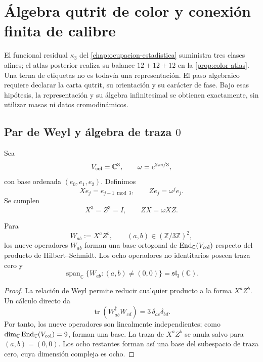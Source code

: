 \chapter{Álgebra qutrit de color y conexión finita de calibre}
\label{chap:algebra-color-qutrit}

El funcional residual \(\kappa_3\) del
\cref{chap:ocupacion-estadistica} suministra tres clases afines; el atlas
posterior realiza su balance \(12+12+12\) en la
\cref{prop:color-atlas}. Una terna de etiquetas no es todavía una
representación. El paso algebraico requiere declarar la carta qutrit, su
orientación y su carácter de fase. Bajo esas hipótesis, la representación y
su álgebra infinitesimal se obtienen exactamente, sin utilizar masas ni datos
cromodinámicos.

\section{Par de Weyl y álgebra de traza \(0\)}
\label{sec:weyl-color-qutrit}

Sea
\[
 V_{\rm col}=\mathbb C^3,
 \qquad
 \omega=e^{2\pi i/3},
\]
con base ordenada \((e_0,e_1,e_2)\). Definimos
\[
 Xe_j=e_{j+1\bmod3},
 \qquad
 Ze_j=\omega^j e_j.
\]
Se cumplen
\[
 X^3=Z^3=I,
 \qquad
 ZX=\omega XZ.
\]

\begin{theorem}
\label{thm:weyl-sl3-color}
Para
\[
 W_{ab}:=X^aZ^b,
 \qquad
 (a,b)\in(\mathbb Z/3\mathbb Z)^2,
\]
los nueve operadores \(W_{ab}\) forman una base ortogonal de
\(\operatorname{End}_{\mathbb C}(V_{\rm col})\) respecto del producto de
Hilbert--Schmidt. Los ocho operadores no identitarios poseen traza cero y
\[
 \operatorname{span}_{\mathbb C}
 \{W_{ab}:(a,b)\ne(0,0)\}
 =\mathfrak{sl}_3(\mathbb C).
\]
\end{theorem}

\begin{proof}
La relación de Weyl permite reducir cualquier producto a la forma
\(X^aZ^b\). Un cálculo directo da
\[
 \operatorname{tr}(W_{ab}^{\dagger}W_{cd})
 =3\,\delta_{ac}\delta_{bd}.
\]
Por tanto, los nueve operadores son linealmente independientes; como
\(\dim_{\mathbb C}\operatorname{End}_{\mathbb C}(V_{\rm col})=9\), forman una
base. La traza de \(X^aZ^b\) se anula salvo para
\((a,b)=(0,0)\). Los ocho restantes forman así una base del subespacio de
traza cero, cuya dimensión compleja es ocho.
\end{proof}

